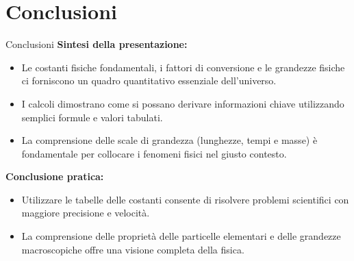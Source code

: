 \documentclass[9pt]{beamer}
\begin{document}
\section{Conclusioni}
\begin{frame}{Conclusioni}
    \textbf{Sintesi della presentazione:}
    \begin{itemize}
        \item Le costanti fisiche fondamentali, i fattori di conversione e le grandezze fisiche ci forniscono un quadro quantitativo essenziale dell'universo.
        \item I calcoli dimostrano come si possano derivare informazioni chiave utilizzando semplici formule e valori tabulati.
        \item La comprensione delle scale di grandezza (lunghezze, tempi e masse) è fondamentale per collocare i fenomeni fisici nel giusto contesto.
    \end{itemize}

    \textbf{Conclusione pratica:}
    \begin{itemize}
        \item Utilizzare le tabelle delle costanti consente di risolvere problemi scientifici con maggiore precisione e velocità.
        \item La comprensione delle proprietà delle particelle elementari e delle grandezze macroscopiche offre una visione completa della fisica.
    \end{itemize}
\end{frame}
\end{document}
